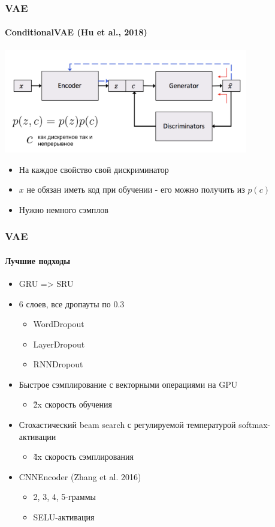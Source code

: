 \documentclass[10pt]{beamer}
\begin{document}
\begin{frame}
\frametitle{VAE}
\framesubtitle{ConditionalVAE (Hu et al., 2018)}

\begin{center}
    \includegraphics[width=0.8\textwidth]{images/cvae.png}
\end{center}
\begin{itemize}
    \item На каждое свойство свой дискриминатор
    \item $x$ не обязан иметь код при обучении - его можно получить из $p(c)$
    \item Нужно немного сэмплов
\end{itemize}

\end{frame}
\begin{frame}
\frametitle{VAE}
\framesubtitle{Лучшие подходы}

\begin{itemize}
    \item GRU => SRU
    \item 6 слоев, все дропауты по 0.3
    \begin{itemize}
        \item WordDropout
        \item LayerDropout
        \item RNNDropout
    \end{itemize}
    \item Быстрое сэмплирование с векторными операциями на GPU
    \begin{itemize}
        \item \~2x скорость обучения
    \end{itemize}
    \item Стохастический beam search с регулируемой температурой softmax-активации
    \begin{itemize}
        \item \~4x скорость сэмплирования
    \end{itemize}
    \item CNNEncoder (Zhang et al. 2016)
    \begin{itemize}
        \item 2, 3, 4, 5-граммы
        \item SELU-активация
    \end{itemize}
\end{itemize}

\end{frame}
\end{document}
